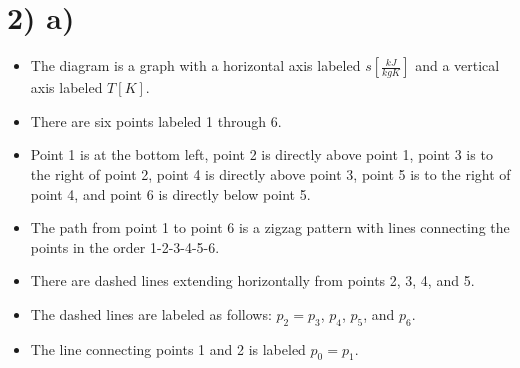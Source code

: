 \section*{2) a)}

\begin{itemize}
    \item The diagram is a graph with a horizontal axis labeled $s \left[ \frac{kJ}{kgK} \right]$ and a vertical axis labeled $T \left[ K \right]$.
    \item There are six points labeled 1 through 6.
    \item Point 1 is at the bottom left, point 2 is directly above point 1, point 3 is to the right of point 2, point 4 is directly above point 3, point 5 is to the right of point 4, and point 6 is directly below point 5.
    \item The path from point 1 to point 6 is a zigzag pattern with lines connecting the points in the order 1-2-3-4-5-6.
    \item There are dashed lines extending horizontally from points 2, 3, 4, and 5.
    \item The dashed lines are labeled as follows: $p_2 = p_3$, $p_4$, $p_5$, and $p_6$.
    \item The line connecting points 1 and 2 is labeled $p_0 = p_1$.
\end{itemize}
